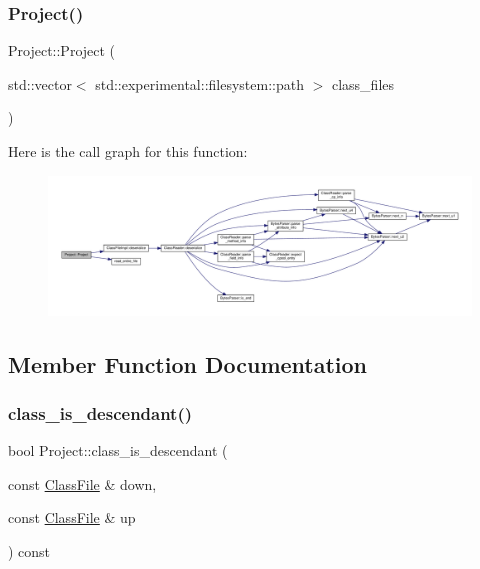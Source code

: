 \subsubsection{\texorpdfstring{Project()}{Project()}}
{\footnotesize\ttfamily Project\+::\+Project (\begin{DoxyParamCaption}\item[{std\+::vector$<$ std\+::experimental\+::filesystem\+::path $>$}]{class\+\_\+files }\end{DoxyParamCaption})}

Here is the call graph for this function\+:\nopagebreak
\begin{figure}[H]
\begin{center}
\leavevmode
\includegraphics[width=350pt]{classProject_aa263ab552c113e7a9db9e90c3dac0879_cgraph}
\end{center}
\end{figure}


\subsection{Member Function Documentation}
\mbox{\label{classProject_a6ef93527bbe86e9bdfbc6d624eab0834}} 
\subsubsection{\texorpdfstring{class\+\_\+is\+\_\+descendant()}{class\_is\_descendant()}}
{\footnotesize\ttfamily bool Project\+::class\+\_\+is\+\_\+descendant (\begin{DoxyParamCaption}\item[{const \hyperlink{classfile_8h_a00b46b60bc40e813e9fb1bb049174346}{Class\+File} \&}]{down,  }\item[{const \hyperlink{classfile_8h_a00b46b60bc40e813e9fb1bb049174346}{Class\+File} \&}]{up }\end{DoxyParamCaption}) const\hspace{0.3cm}{\ttfamily [private]}}


